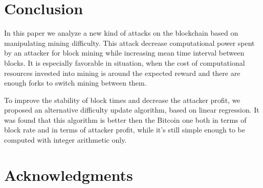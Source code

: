 \documentclass[]{llncs}
\begin{document}
\section{Conclusion}
\label{sec:concl}

In this paper we analyze a new kind of attacks on the blockchain based on manipulating mining difficulty.
This attack decrease computational power spent by an attacker for block mining while increasing mean time interval between blocks.
It is especially favorable in situation, when the cost of computational resources invested into mining is around the expected reward and there are enough forks to switch mining between them.

To improve the stability of block times and decrease the attacker profit, we proposed an alternative difficulty update algorithm, based on linear regression.
It was found that this algorithm is better then the Bitcoin one both in terms of block rate and in terms of attacker profit, while it's still simple enough to be computed with integer arithmetic only.

\section*{Acknowledgments}



\end{document}
